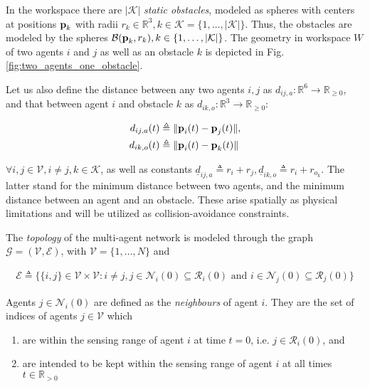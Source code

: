 In the workspace there are $|\mathcal{K}|$ \textit{static obstacles}, modeled as
spheres with centers at positions $\bm{\mathbf{p}}_{k}$ with radii
$r_{k}\in \mathbb{R}^3, k \in \mathcal{K} = \{1,\dots,|\mathcal{K}| \}$.
Thus, the obstacles are modeled by the spheres
$\mathcal{B}(\bm{\mathbf{p}}_{k}, r_{k}), k \in \{1,\dots,|\mathcal{K}|\}$. The geometry in
workspace $W$ of two agents $i$ and $j$ as well as an obstacle $k$ is depicted
in Fig. \ref{fig:two_agents_one_obstacle}.

Let us also define the distance between any two agents $i,j$ as
$d_{ij,a}: \mathbb{R}^6 \to \mathbb{R}_{\geq 0}$, and that between agent $i$
and obstacle $k$ as $d_{ik,o} : \mathbb{R}^3 \to \mathbb{R}_{\geq 0}$:

\begin{subequations}
	\begin{align}
    d_{ij,a}(t) &\triangleq \| \bm{\mathbf{p}}_i(t) - \bm{\mathbf{p}}_j(t) \|, \\
    d_{ik,o}(t) &\triangleq \| \bm{\mathbf{p}}_i(t) - \bm{\mathbf{p}}_k(t) \|
	\end{align}
\end{subequations}

$\forall i, j \in \mathcal{V}, i \neq j, k \in \mathcal{K}$, as well as
constants $\underline{d}_{ij, a} \triangleq r_{i} + r_{j},
\underline{d}_{ik, o} \triangleq r_{i} + r_{o_k}$. The latter stand for
the minimum distance between two agents, and the minimum distance between an
agent and an obstacle. These arise spatially as physical limitations and will
be utilized as collision-avoidance constraints.

The \textit{topology} of the multi-agent network is modeled through the graph
$\mathcal{G} = (\mathcal{V},\mathcal{E})$, with $\mathcal{V}=\{1,\dots,N\}$ and

\begin{align}
\mathcal{E} \triangleq \big\{\{i,j\}\in\mathcal{V}\times\mathcal{V} :
  i \neq j,
  j\in\mathcal{N}_i(0) \subseteq \mathcal{R}_i(0) \text{ and }
  i \in \mathcal{N}_j(0) \subseteq \mathcal{R}_j(0) \big\}
  \label{eq:edges_set}
\end{align}

Agents $j \in \mathcal{N}_i(0)$ are defined as the \textit{neighbours} of
agent $i$. They are the set of indices of agents $j \in \mathcal{V}$ which

\begin{enumerate}
  \item are within the sensing range of agent $i$ at time $t=0$, i.e.
    $j \in \mathcal{R}_i(0)$, and
  \item are intended to be kept within the sensing range of agent $i$ at all
    times $t \in \mathbb{R}_{> 0}$
\end{enumerate}

